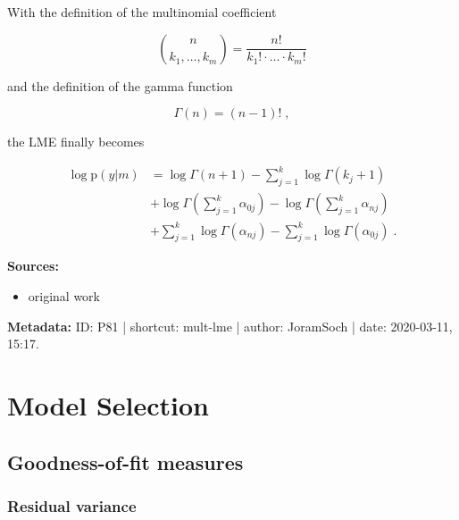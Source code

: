 \documentclass[a4paper,12pt,twoside]{book}
\begin{document}
With the definition of the multinomial coefficient

\begin{equation} \label{eq:mult-lme-mult-coeff}
{n \choose {k_1, \ldots, k_m}} = \frac{n!}{k_1! \cdot \ldots \cdot k_m!}
\end{equation}

and the definition of the gamma function

\begin{equation} \label{eq:mult-lme-gam-fct}
\Gamma(n) = (n-1)! \; ,
\end{equation}

the LME finally becomes

\begin{equation} \label{eq:mult-lme-Mult-LME-s2}
\begin{split}
\log \mathrm{p}(y|m) &= \log \Gamma(n+1) - \sum_{j=1}^{k} \log \Gamma(k_j+1) \\
&+ \log \Gamma \left( \sum_{j=1}^{k} \alpha_{0j} \right) - \log \Gamma \left( \sum_{j=1}^{k} \alpha_{nj} \right) \\
&+ \sum_{j=1}^k \log \Gamma(\alpha_{nj}) - \sum_{j=1}^k \log \Gamma(\alpha_{0j}) \; .
\end{split}
\end{equation}


\vspace{1em}
\textbf{Sources:}
\begin{itemize}
\item original work\end{itemize}


\vspace{1em}
\textbf{Metadata:} ID: P81 | shortcut: mult-lme | author: JoramSoch | date: 2020-03-11, 15:17.
\vspace{1em}





\chapter{Model Selection} \label{sec:Model Selection} \newpage

\pagebreak
\section{Goodness-of-fit measures}

\subsection{Residual variance}
\end{document}
